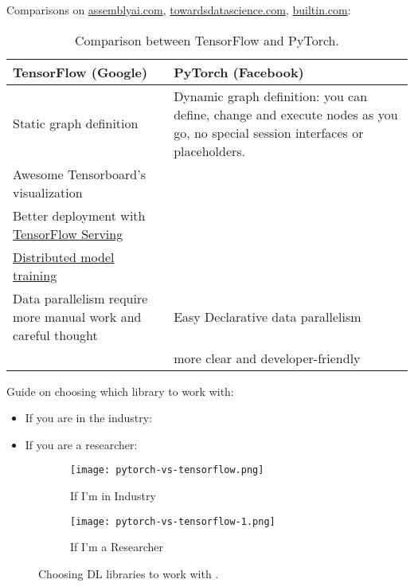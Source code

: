 Comparisons on \href{https://www.assemblyai.com/blog/pytorch-vs-tensorflow-in-2022/}{assemblyai.com}, \href{https://towardsdatascience.com/pytorch-vs-tensorflow-spotting-the-difference-25c75777377b}{towardsdatascience.com}, \href{https://builtin.com/data-science/pytorch-vs-tensorflow}{builtin.com}: 
\begin{table}[hbt!]
	\centering
	\begin{tabular}{m{7.9cm}|m{7.9cm}}
		TensorFlow (Google) & PyTorch (Facebook)\\ \hline\hline
		Static graph definition & Dynamic graph definition: \newline you can define, change and execute nodes as you go, no special session interfaces or placeholders.\\ \hline
		Awesome Tensorboard's visualization &\\ \hline
		Better deployment with \href{https://www.tensorflow.org/tfx/guide/serving}{TensorFlow Serving} & \\ \hline
		\href{https://www.tensorflow.org/guide/distributed_training}{Distributed model training} & \\ \hline
		Data parallelism require more manual work and careful thought & Easy Declarative data parallelism\\ \hline
		& more clear and developer-friendly
	\end{tabular}
	\caption{Comparison between TensorFlow and PyTorch.}
	\label{tab:tensorflow-vs-pytorch}
\end{table}

Guide on choosing which library to work with:
\begin{itemize}
	\item If you are in the industry: 
	\item If you are a researcher: 
\end{itemize}
\begin{figure}[hbt!]
	\centering
	\begin{subfigure}[b]{0.49\textwidth}
		\centering
		\texttt{[image: pytorch-vs-tensorflow.png]}
		\caption{If I’m in Industry}
		\label{fig:pytorch-vs-tensorflow}
	\end{subfigure}
	\hfill
	\begin{subfigure}[b]{0.49\textwidth}
		\centering
		\texttt{[image: pytorch-vs-tensorflow-1.png]}
		\caption{If I’m a Researcher}
		\label{fig:pytorch-vs-tensorflow-1}
	\end{subfigure}
	\caption{Choosing \ac{DL} libraries to work with \cite{cornor2021}.}
\end{figure}

